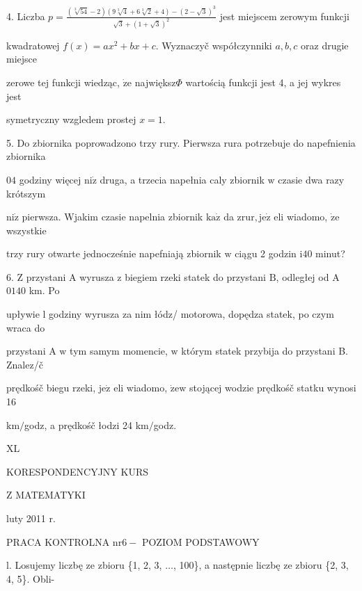 \documentclass[a4paper,12pt]{article}
\begin{document}
4. Liczba $p = \displaystyle \frac{(\sqrt[3]{54}-2)(9\sqrt[3]{4}+6\sqrt[3]{2}+4)-(2-\sqrt{3})^{3}}{\sqrt{3}+(1+\sqrt{3})^{2}}$ jest miejscem zerowym funkcji

kwadratowej $f(x)=ax^{2}+bx+c$. Wyznaczyč współczynniki $a, b, c$ oraz drugie miejsce

zerowe tej funkcji wiedząc, $\dot{\mathrm{z}}\mathrm{e}$ największ$\Phi$ wartością funkcji jest 4, a jej wykres jest

symetryczny wzgledem prostej $x=1.$

5. Do zbiornika poprowadzono trzy rury. Pierwsza rura potrzebuje do napefnienia zbiornika

$04$ godziny więcej $\mathrm{n}\mathrm{i}\dot{\mathrm{z}}$ druga, a trzecia napełnia caly zbiornik $\mathrm{w}$ czasie dwa razy krótszym

$\mathrm{n}\mathrm{i}\dot{\mathrm{z}}$ pierwsza. Wjakim czasie napelnia zbiornik $\mathrm{k}\mathrm{a}\dot{\mathrm{z}}$ da $\mathrm{z}\mathrm{r}\mathrm{u}\mathrm{r}, \mathrm{j}\mathrm{e}\dot{\mathrm{z}}$ eli wiadomo, $\dot{\mathrm{z}}\mathrm{e}$ wszystkie

trzy rury otwarte jednocześnie napefniają zbiornik $\mathrm{w}$ ciągu 2 godzin $\mathrm{i}40$ minut?

6. $\mathrm{Z}$ przystani A wyrusza $\mathrm{z}$ biegiem rzeki statek do przystani $\mathrm{B}$, odległej od A $0140$ km. Po

upływie l godziny wyrusza za nim łódz/ motorowa, dopędza statek, po czym wraca do

przystani A $\mathrm{w}$ tym samym momencie, $\mathrm{w}$ którym statek przybija do przystani B. Znalez/č

prędkośč biegu rzeki, $\mathrm{j}\mathrm{e}\dot{\mathrm{z}}$ eli wiadomo, $\dot{\mathrm{z}}\mathrm{e}\mathrm{w}$ stojącej wodzie prędkośč statku wynosi 16

$\mathrm{k}\mathrm{m}/$godz, a prędkośč łodzi 24 $\mathrm{k}\mathrm{m}/$godz.





XL

KORESPONDENCYJNY KURS

Z MATEMATYKI

luty 2011 r.

PRACA KONTROLNA $\mathrm{n}\mathrm{r} 6-$ POZIOM PODSTAWOWY

l. Losujemy liczbę ze zbioru \{1, 2, 3, $\ldots$, 100\}, a następnie liczbę ze zbioru \{2, 3, 4, 5\}. Obli-
\end{document}
